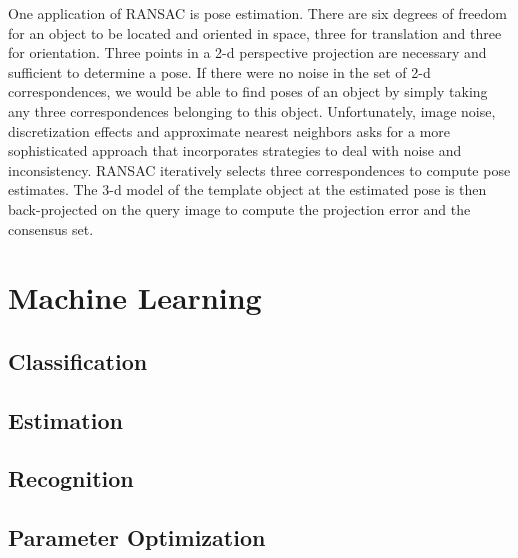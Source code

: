 One application of RANSAC is pose estimation. There are six degrees of freedom
for an object to be located and oriented in space, three for translation and
three for orientation. Three points in a 2-d perspective projection are
necessary and sufficient to determine a pose. If there were no noise in the set
of 2-d correspondences, we would be able to find poses of an object by simply
taking any three correspondences belonging to this object. Unfortunately, image
noise, discretization effects and approximate nearest neighbors asks for a more
sophisticated approach that incorporates strategies to deal with noise and
inconsistency. RANSAC iteratively selects three correspondences to compute pose
estimates. The 3-d model of the template object at the estimated pose is then
back-projected on the query image to compute the projection error and the
consensus set.

\section{Machine Learning}

\subsection{Classification}

\subsection{Estimation}

\subsection{Recognition}

\subsection{Parameter Optimization}


